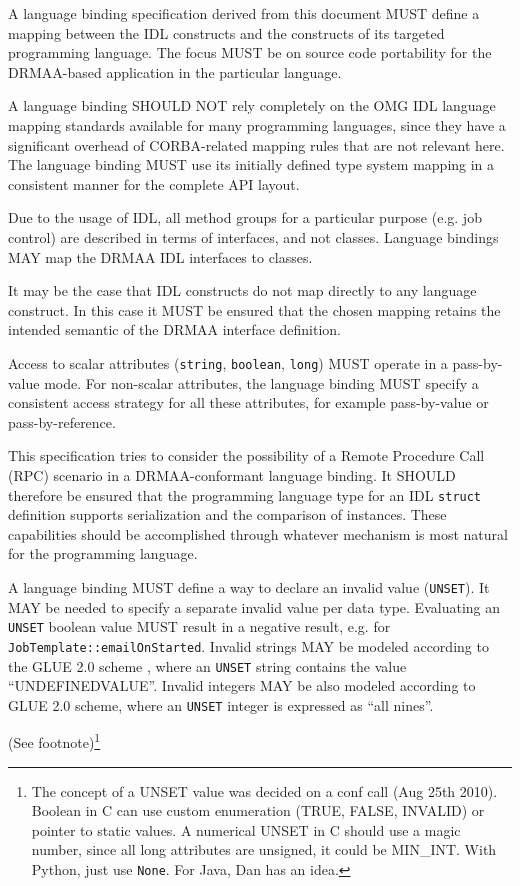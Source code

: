 \documentclass{article}
\newcommand{\h}[1]{\lstinline|#1|}
\newcommand{\langbind}[1]{\begin{shaded}#1\end{shaded}}
\newcommand{\rat}[1]{ {\tiny(See footnote)}\footnote{#1} }
\begin{document}
\langbind{
A language binding specification derived from this document MUST define a mapping between the IDL constructs and the constructs of its targeted programming language. The focus MUST be on source code portability for the DRMAA-based application in the particular language. 

A language binding SHOULD NOT rely completely on the OMG IDL language mapping standards available for many programming languages, since they have a significant overhead of CORBA-related mapping rules that are not relevant here. The language binding MUST use its initially defined type system mapping in a consistent manner for the complete API layout. 

Due to the usage of IDL, all method groups for a particular purpose (e.g. job control) are described in terms of interfaces, and not classes. Language bindings MAY map the DRMAA IDL interfaces to classes.

It may be the case that IDL constructs do not map directly to any language construct. In this case it MUST be ensured that the chosen mapping retains the intended semantic of the DRMAA interface definition.

Access to scalar attributes (\h{string}, \h{boolean}, \h{long}) MUST operate in a pass-by-value mode. For non-scalar attributes, the language binding MUST specify a consistent access strategy for all these attributes, for example pass-by-value or pass-by-reference.

This specification tries to consider the possibility of a Remote Procedure Call (RPC) scenario in a DRMAA-conformant language binding. It SHOULD therefore be ensured that the programming language type for an IDL \h{struct} definition supports serialization and the comparison of instances. These capabilities should be accomplished through whatever mechanism is most natural for the programming language.

A language binding MUST define a way to declare an invalid value (\h{UNSET}). It MAY be needed to specify a separate invalid value per data type. Evaluating an \h{UNSET} boolean value MUST result in a negative result, e.g. for \h{JobTemplate::emailOnStarted}. Invalid strings MAY be modeled according to the GLUE 2.0 scheme \cite{gfd.147}, where an \h{UNSET} string contains the value \enquote{UNDEFINEDVALUE}.  Invalid integers MAY be also modeled according to GLUE 2.0 scheme, where an \h{UNSET} integer is expressed as \enquote{all nines}.
}

\rat{
The concept of a UNSET value was decided on a conf call (Aug 25th 2010). Boolean in C can use custom enumeration (TRUE, FALSE, INVALID) or pointer to static values. A numerical UNSET in C should use a magic number, since all long attributes are unsigned, it could be MIN\_INT. With Python, just use \h{None}. For Java, Dan has an idea.
}
\end{document}
